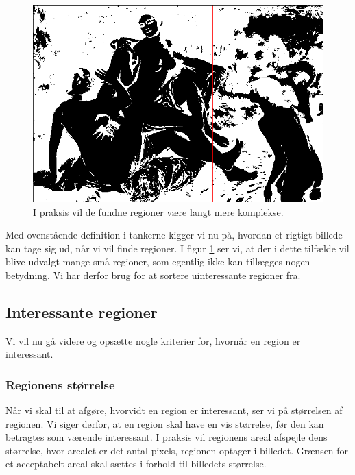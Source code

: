 {\begin{figure}[p]
    \begin{center}
        \includegraphics[scale=0.42,angle=0]{afsnit/vores_implementation/billeder/naiv_algoritme/bathers_mockup_blob}
    \end{center}
    \caption[Interessante regioner i praksis]{I praksis vil de
    fundne regioner være langt mere komplekse.}
    \label{realworld_example}
\end{figure}

Med ovenstående definition i tankerne kigger vi nu på, hvordan et
rigtigt billede kan tage sig ud, når vi vil finde regioner. I figur
\ref{realworld_example} ser vi, at der i dette tilfælde vil blive
udvalgt mange små regioner, som egentlig ikke kan tillægges nogen
betydning. Vi har derfor brug for at sortere uinteressante regioner fra.

\subsection{Interessante regioner}
Vi vil nu gå videre og opsætte nogle kriterier for, hvornår en region er
interessant.

\subsubsection{Regionens størrelse}
Når vi skal til at afgøre, hvorvidt en region er interessant, ser vi på
størrelsen af regionen.  Vi siger derfor, at en region skal have en vis
størrelse, før den kan betragtes som værende interessant. I praksis vil
regionens areal afspejle dens størrelse, hvor arealet er det antal
pixels, regionen optager i billedet.  Grænsen for et acceptabelt areal
skal sættes i forhold til billedets størrelse.

}
